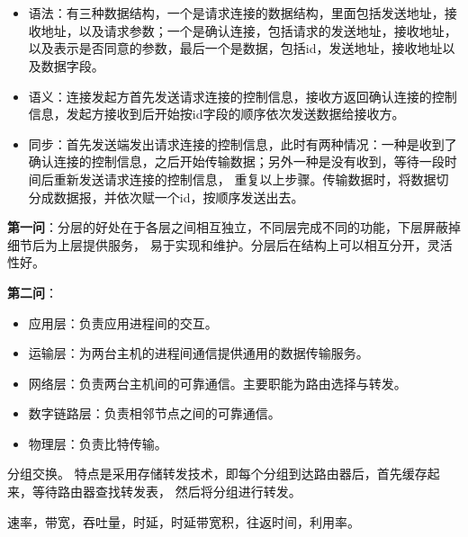 \documentclass{ctexart}
\newcounter{answercnt}
\newcommand{\sCourse}{计算机网络}   %
\newcommand{\nTime}{1}             %
\newcommand{\sName}{黄昊}           %
\newcommand{\sNumber}{20204205}     %
\begin{document}
    \setcounter{answercnt}{0}
    \begin{center}
        \\
        \fontsize{13pt}{0}{\textit{\kaishu\sName\qquad\sNumber}}\\
    \end{center}



\begin{itemize}
    \item 语法：有三种数据结构，一个是请求连接的数据结构，里面包括发送地址，接收地址，以及请求参数；一个是确认连接，包括请求的发送地址，接收地址，以及表示是否同意的参数，最后一个是数据，包括id，发送地址，接收地址以及数据字段。
    \item 语义：连接发起方首先发送请求连接的控制信息，接收方返回确认连接的控制信息，发起方接收到后开始按id字段的顺序依次发送数据给接收方。
    \item 同步：首先发送端发出请求连接的控制信息，此时有两种情况：一种是收到了确认连接的控制信息，之后开始传输数据；另外一种是没有收到，等待一段时间后重新发送请求连接的控制信息，
    重复以上步骤。传输数据时，将数据切分成数据报，并依次赋一个id，按顺序发送出去。
\end{itemize}


\textbf{第一问}：分层的好处在于各层之间相互独立，不同层完成不同的功能，下层屏蔽掉细节后为上层提供服务，
易于实现和维护。分层后在结构上可以相互分开，灵活性好。

\textbf{第二问}：
\begin{itemize}
    \item 应用层：负责应用进程间的交互。
    \item 运输层：为两台主机的进程间通信提供通用的数据传输服务。
    \item 网络层：负责两台主机间的可靠通信。主要职能为路由选择与转发。
    \item 数字链路层：负责相邻节点之间的可靠通信。
    \item 物理层：负责比特传输。
\end{itemize}

分组交换。
特点是采用存储转发技术，即每个分组到达路由器后，首先缓存起来，等待路由器查找转发表，
然后将分组进行转发。

速率，带宽，吞吐量，时延，时延带宽积，往返时间，利用率。
\end{document}
